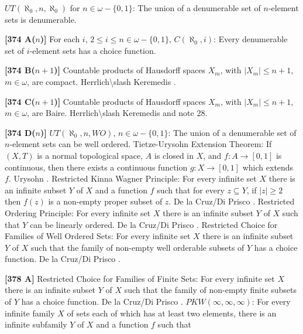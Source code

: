 \medskip
{} $UT(\aleph_0,n,\aleph_0)$ for $n\in\omega
-\{0,1\}$: The union of a denumerable set of $n$-element sets is
denumerable.
\smallskip
\item{}{\bf [374 A($n$)]} For each $i$, $2\le i\le n\in\omega-\{0,1\}$,
$C(\aleph_0,i)$: Every denumerable set of $i$-element sets has a choice
function.
\smallskip
\item{}{\bf [374 B($n+1$)]} Countable products of Hausdorff spaces $X_m$,
with $|X_m|\leq n+1$, $m\in\omega$, are compact. \ac{Herrlich\slash
Keremedis} \cite{1999b}.
\smallskip
\item{}{\bf [374 C($n+1$)]} Countable products of Hausdorff spaces $X_m$,
with $|X_m|\leq n+1$, $m\in\omega$, are Baire. \ac{Herrlich\slash Keremedis}
\cite{1999b} and note 28.
\smallskip
\item{}{\bf [374 D($n$)]} $UT(\aleph_0,n,WO)$, $n\in\omega-\{0,1\}$:
The union of a denumerable set of $n$-element sets can be well ordered.
\medskip
{} Tietze-Urysohn Extension Theorem: If
$(X,T)$ is a normal topological space, $A$ is closed in $X$, and
$f: A\to [0,1]$ is continuous, then there exists a continuous
function $g: X\to [0,1]$ which extends $f$. \ac{Urysohn} \cite{1924}.
\medskip
{} Restricted Kinna Wagner Principle:  For every
infinite set $X$ there is an infinite subset $Y$ of $X$ and a function
$f$ such that for every $z\subseteq Y$, if $|z| \ge 2$ then $f(z)$
is a non-empty proper subset of $z$.  De la Cruz/Di \ac{Prisco}
\cite{1998a}.
\medskip
{} Restricted Ordering Principle:  For every
infinite set $X$ there is an infinite subset $Y$ of $X$ such that $Y$
can be linearly ordered.  De la Cruz/Di \ac{Prisco} \cite{1998a}.
\medskip
{} Restricted Choice for Families of Well Ordered
Sets:  For every infinite set $X$ there is an infinite subset $Y$ of
$X$ such that the family of non-empty well orderable subsets of $Y$
has a choice function.  De la Cruz/Di \ac{Prisco} \cite{1998a}.
\smallskip
\item{}{\bf [378 A]} Restricted Choice for Families of Finite Sets:
For every infinite set $X$ there is an infinite subset $Y$ of
$X$ such that the family of non-empty finite subsets of $Y$
has a choice function.  De la Cruz/Di \ac{Prisco} \cite{1998a}.
\medskip
{} $PKW(\infty,\infty,\infty)$: For every infinite
family $X$ of sets each of which has at least two elements, there
is an infinite subfamily $Y$ of $X$ and a function $f$ such that
